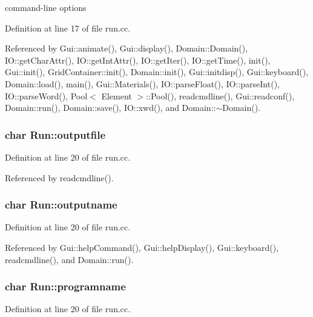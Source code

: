 command-line options 



Definition at line 17 of file run.cc.

Referenced by Gui::animate(), Gui::display(), Domain::Domain(), IO::getCharAttr(), IO::getIntAttr(), IO::getIter(), IO::getTime(), init(), Gui::init(), GridContainer::init(), Domain::init(), Gui::initdisp(), Gui::keyboard(), Domain::load(), main(), Gui::Materials(), IO::parseFloat(), IO::parseInt(), IO::parseWord(), Pool$<$ Element $>$::Pool(), readcmdline(), Gui::readconf(), Domain::run(), Domain::save(), IO::xwd(), and Domain::$\sim$Domain().\hypertarget{namespaceRun_4f57473c9c02d920b7b738c37597f972}{
\subsubsection[{outputfile}]{\setlength{\rightskip}{0pt plus 5cm}char {\bf Run::outputfile}}}
\label{namespaceRun_4f57473c9c02d920b7b738c37597f972}




Definition at line 20 of file run.cc.

Referenced by readcmdline().\hypertarget{namespaceRun_764ba544be98b57556f317ca171d7969}{
\subsubsection[{outputname}]{\setlength{\rightskip}{0pt plus 5cm}char {\bf Run::outputname}}}
\label{namespaceRun_764ba544be98b57556f317ca171d7969}




Definition at line 20 of file run.cc.

Referenced by Gui::helpCommand(), Gui::helpDisplay(), Gui::keyboard(), readcmdline(), and Domain::run().\hypertarget{namespaceRun_f2d1163d068ab8ea8c75abd469c4a43f}{
\subsubsection[{programname}]{\setlength{\rightskip}{0pt plus 5cm}char {\bf Run::programname}}}
\label{namespaceRun_f2d1163d068ab8ea8c75abd469c4a43f}




Definition at line 20 of file run.cc.

